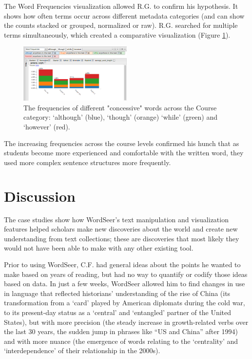 \documentclass{sig-alternate}
\begin{document}
The Word Frequencies visualization allowed R.G. to confirm his hypothesis. It shows how often terms occur across different metadata categories (and can show the counts stacked or grouped, normalized or raw). R.G. searched for multiple terms simultaneously, which created a comparative visualization (Figure \ref{fig:rex05}).
\begin{figure}[h!]
\includegraphics[width=0.5\textwidth]{fig/rex/05.png}
\caption{The frequencies of different "concessive" words across the Course category: `although' (blue), `though' (orange) `while' (green) and `however' (red). \label{fig:rex05}}
\end{figure}
The increasing frequencies across the course levels confirmed his hunch that as students become more experienced and comfortable with the written word, they used more complex sentence structures more frequently. 

\section{Discussion}
The case studies show how WordSeer's text manipulation and visualization features helped scholars make new discoveries about the world and create new understanding from text collections; these are discoveries that most likely they would not have been able to make with any other existing tool.

Prior to using WordSeer, C.F. had general ideas about the points he wanted to make based on years of reading, but had no way to quantify or codify those ideas based on data.  In just a few weeks, WordSeer allowed him to find changes in use in language that reflected historians' understanding of the rise of China (its transformation from a `card' played by American diplomats during the cold war,  to its present-day status as a `central' and `entangled' partner of the United States), but with more precision (the steady increase in growth-related verbs over the last 30 years, the sudden jump in  phrases like ``US and China'' after 1994) and with more nuance (the emergence of words relating to the `centrality' and `interdependence'  of their relationship in the 2000s).
\end{document}

